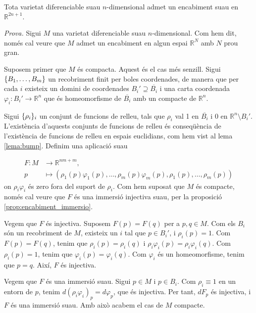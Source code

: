 \begin{teo}\label{teo:whitney}
    Tota varietat diferenciable suau $n$-dimensional admet un encabiment suau en $\mathbb R^{2n+1}$.
\end{teo}
{
    \color{green!50!black} \textit{Prova.}
    Sigui $M$ una varietat diferenciable suau $n$-dimensional. Com hem dit, només cal veure que $M$ admet un encabiment en algun espai $\mathbb R^N$ amb $N$ prou gran.

    Suposem primer que $M$ és compacta. Aquest és el cas més senzill. Sigui $\{B_1,\dots,B_m\}$ un recobriment finit per boles coordenades, de manera que per cada $i$ existeix un domini de coordenades $B_i'\supseteq \overline{B_i}$ i una carta coordenada $\varphi_i:B_i'\to\mathbb R^n$ que és homeomorfisme de $\overline{B_i}$ amb un compacte de $\mathbb R^n$.

    Sigui $\{\rho_i\}_i$ un conjunt de funcions de relleu, tals que $\rho_i$ val 1 en $\overline{B_i}$ i 0 en $\mathbb R^n\setminus B_i'$. L'existència d'aquests conjunts de funcions de relleu és conseqüència de l'existència de funcions de relleu en espais euclidians, com hem vist al lema \ref{lema:bump}. Definim una aplicació suau

    \begin{align*}
        F:M&\to\mathbb R^{nm + m},\\
        p&\mapsto \left(\rho_1(p)\varphi_1(p),\dots,\rho_m(p)\varphi_m(p), \rho_1(p),\dots,\rho_m(p)\right)
    \end{align*}
    on $\rho_i\varphi_i$ és zero fora del suport de $\rho_i$. Com hem suposat que $M$ és compacte, només cal veure que $F$ és una immersió injectiva suau, per la proposició \ref{prop:encabiment_immersio}.

    Vegem que $F$ és injectiva. Suposem $F(p) = F(q)$ per a $p,q\in M$. Com els $B_i$ són un recobriment de $M$, existeix un $i$ tal que $p\in B_i'$, i $\rho_i(p)=1$. Com $F(p) = F(q)$, tenim que $\rho_i(p) = \rho_i(q)$ i $\rho_i\varphi_i(p) = \rho_i\varphi_i(q)$. Com $\rho_i(p)=1$, tenim que $\varphi_i(p) = \varphi_i(q)$. Com $\varphi_i$ és un homeomorfisme, tenim que $p=q$. Així, $F$ és injectiva.

    Vegem que $F$ és una immersió suau. Sigui $p\in M$ i $p\in B_i$. Com $\rho_i\equiv1$ en un entorn de $p$, tenim $d(\rho_i\varphi_i)_p = d\varphi_p$, que és injectiva. Per tant, $dF_p$ és injectiva, i $F$ és una immersió suau.
    Amb això acabem el cas de $M$ compacte.

}
